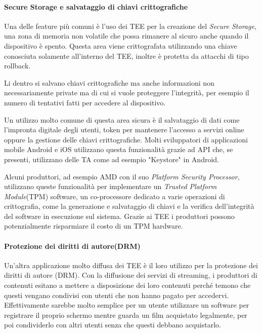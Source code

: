 \documentclass[12pt,italian]{report}
\begin{document}
\paragraph{Secure Storage e salvataggio di chiavi crittografiche}

Una delle feature più comuni è l'uso dei TEE per la creazione del
\textit{Secure Storage}, una zona di memoria non volatile che possa rimanere
al sicuro anche quando il dispositivo è spento.
Questa area viene crittografata utilizzando una chiave conosciuta solamente
all'interno del TEE, inoltre è protetta da attacchi di tipo rollback.

Li dentro si salvano chiavi crittografiche ma anche informazioni non
necessariamente private ma di cui si vuole proteggere l'integrità, per esempio
il numero di tentativi fatti per accedere al dispositivo.

Un utilizzo molto comune di questa area sicura è il salvataggio di dati
come l'impronta digitale degli utenti, token per mantenere l'accesso a
servizi online oppure la gestione delle chiavi crittografiche.
Molti sviluppatori di applicazioni mobile Android e iOS utilizzano questa
funzionalità grazie ad API che, se presenti, utilizzano delle TA come ad
esempio "Keystore"\cite{androidkeystore} in Android.

Alcuni produttori, ad esempio AMD con il suo
\textit{Platform Security Processor}\cite{amd2020ftpm}, utilizzano queste
funzionalità per implementare un \textit{Trusted Platform Module}(TPM)
software, un co-processore dedicato a varie operazioni di crittografia, come
la generazione e salvataggio di chiavi e la verifica dell'integrità del
software in esecuzione sul sistema.
Grazie ai TEE i produttori possono potenzialmente risparmiare il costo di un
TPM hardware.

\paragraph{Protezione dei diritti di autore(DRM)}

Un'altra applicazione molto diffusa dei TEE è il loro utilizzo per la protezione
dei diritti di autore (DRM). Con la diffusione dei servizi di streaming, i
produttori di contenuti esitano a mettere a disposizione dei loro contenuti
perché temono che questi vengano condivisi con utenti che non hanno pagato
per accedervi.
Effettivamente sarebbe molto semplice per un utente utilizzare un software per
registrare il proprio schermo mentre guarda un film acquistato legalmente, per
poi condividerlo con altri utenti senza che questi debbano acquistarlo.
\end{document}
